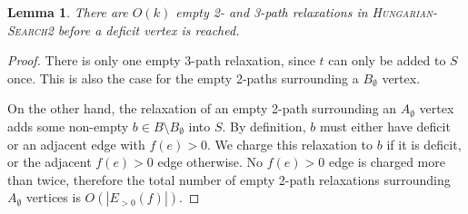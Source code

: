 \documentclass[11pt]{article}
\theoremstyle{plain}
\newtheorem{lemma}{Lemma}
\begin{document}
\begin{lemma}
\label{lemma:goldberg_hs_length2}
	There are $O(k)$ empty 2- and 3-path relaxations in
	\textsc{Hungarian-Search2} before a deficit vertex is reached.
\end{lemma}
\begin{proof}
	There is only one empty 3-path relaxation, since $t$ can only be added
	to $S$ once.
	This is also the case for the empty 2-paths surrounding a $B_\emptyset$
	vertex.

	On the other hand, the relaxation of an empty 2-path surrounding an
	$A_\emptyset$ vertex adds some non-empty
	$b \in B \setminus B_\emptyset$ into $S$.
	By definition, $b$ must either have deficit or an adjacent edge with
	$f(e) > 0$.
	We charge this relaxation to $b$ if it is deficit, or the adjacent
	$f(e) > 0$ edge otherwise.
	No $f(e) > 0$ edge is charged more than twice, therefore the total
	number of empty 2-path relaxations surrounding $A_\emptyset$ vertices
	is $O(|E_{>0}(f)|)$.
\end{proof}



\end{document}
